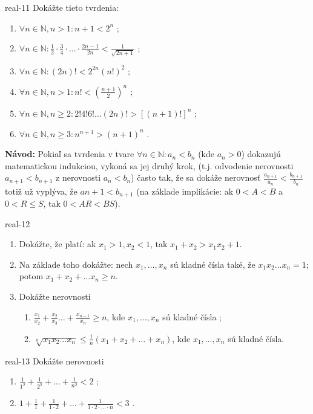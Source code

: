 \begin{defproblem}{real-11}
Dokážte tieto tvrdenia:

\begin{enumerate}
  \item $\forall n \in \mathbb{N}, n > 1: n + 1 < 2^n$ ;
  \item $\forall n \in \mathbb{N}: \frac{1}{2} \cdot \frac{3}{4} \cdot \ldots
         \cdot \frac{2n - 1}{2n} < \frac{1}{\sqrt{2n + 1}}$ ;
  \item $\forall n \in \mathbb{N}: (2n)! < 2^{2n} (n!)^2$ ;
  \item $\forall n \in \mathbb{N}, n > 1: n! < (\frac{n + 1}{2})^n$ ;
  \item $\forall n \in \mathbb{N}, n \geq 2: 2! 4! 6! \ldots (2n)!
          > [(n+1)!]^n$ ;
  \item $\forall n \in \mathbb{N}, n \geq 3: n^{n+1} > (n+1)^n$ .
\end{enumerate}

{\footnotesize \textbf{Návod:} Pokiaľ sa tvrdenia v tvare $\forall n \in \mathbb{N}: a_n < b_n$
(kde $a_n > 0$) dokazujú matematickou indukciou, vykoná sa jej druhý krok,
(t.j. odvodenie nerovnosti $a_{n+1} < b_{n+1}$ z nerovnosti $a_n < b_n$) často
tak, že sa dokáže nerovnosť $\frac{a_{n + 1}}{a_n} < \frac{b_{n + 1}}{b_n}$
totiž už vyplýva, že $a{n + 1} < b_{n+1}$ (na základe implikácie: ak
$0 < A < B$ a $0 < R \leq S$, tak  $0 < AR < BS$).}
\end{defproblem}

\begin{defproblem}{real-12}
\begin{enumerate}
  \item Dokážte, že platí: ak $x_1 > 1, x_2 < 1$, tak $x_1 + x_2 > x_1 x_2 + 1$.
  \item Na základe toho dokážte: nech $x_1, \ldots, x_n$ sú kladné čísla také,
        že $x_1 x_2 \ldots x_n = 1$; potom $x_1 + x_2 + \ldots x_n \geq n$.
  \item Dokážte nerovnosti
        \begin{enumerate}
          \item $\frac{x_1}{x_2} + \frac{x_2}{x_3} \ldots + \frac{x_{n-1}}{x_n}
                 \geq n$, kde $x_1, \ldots, x_n$ sú kladné čísla ;
          \item $\sqrt[n]{x_1 x_2 \ldots x_n} \leq
                 \frac{1}{n}(x_1 + x_2 + \ldots + x_n)$, kde $x_1, \ldots, x_n$
                 sú kladné čísla.
        \end{enumerate}
\end{enumerate}
\end{defproblem}

\begin{defproblem}{real-13}
Dokážte nerovnosti

\begin{enumerate}
  \item $\frac{1}{1^2} + \frac{1}{2^2} + \ldots + \frac{1}{n^2} < 2$ ;
  \item $1 + \frac{1}{1} + \frac{1}{1 \cdot 2} + \ldots +
         \frac{1}{1 \cdot 2 \cdot \ldots \cdot n} < 3$ .
\end{enumerate}
\end{defproblem}
